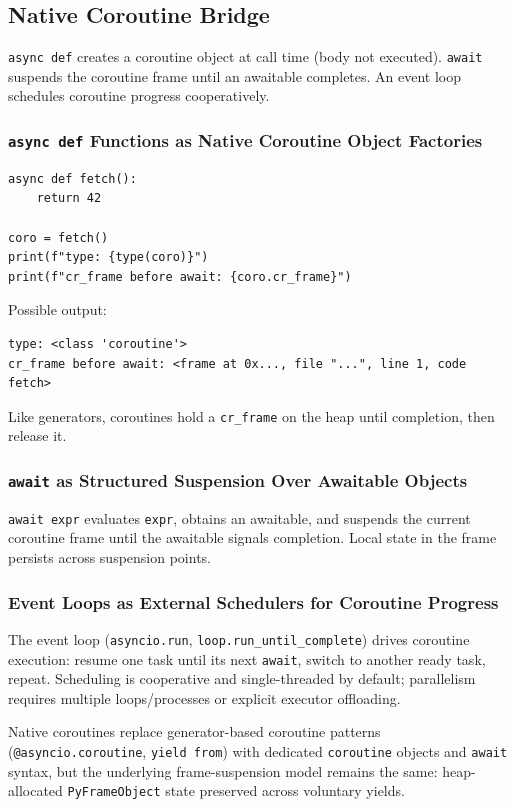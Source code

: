 \subsection{Native Coroutine Bridge}

\texttt{async def} creates a coroutine object at call time (body not executed). \texttt{await} suspends the coroutine frame until an awaitable completes. An event loop schedules coroutine progress cooperatively.

\subsubsection{\texttt{async def} Functions as Native Coroutine Object Factories}

\begin{verbatim}
async def fetch():
    return 42

coro = fetch()
print(f"type: {type(coro)}")
print(f"cr_frame before await: {coro.cr_frame}")
\end{verbatim}

Possible output:

\begin{verbatim}
type: <class 'coroutine'>
cr_frame before await: <frame at 0x..., file "...", line 1, code fetch>
\end{verbatim}

Like generators, coroutines hold a \texttt{cr\_frame} on the heap until completion, then release it.

\subsubsection{\texttt{await} as Structured Suspension Over Awaitable Objects}

\texttt{await expr} evaluates \texttt{expr}, obtains an awaitable, and suspends the current coroutine frame until the awaitable signals completion. Local state in the frame persists across suspension points.

\subsubsection{Event Loops as External Schedulers for Coroutine Progress}

The event loop (\texttt{asyncio.run}, \texttt{loop.run\_until\_complete}) drives coroutine execution: resume one task until its next \texttt{await}, switch to another ready task, repeat. Scheduling is cooperative and single-threaded by default; parallelism requires multiple loops/processes or explicit executor offloading.

Native coroutines replace generator-based coroutine patterns (\texttt{@asyncio.coroutine}, \texttt{yield from}) with dedicated \texttt{coroutine} objects and \texttt{await} syntax, but the underlying frame-suspension model remains the same: heap-allocated \texttt{PyFrameObject} state preserved across voluntary yields.
